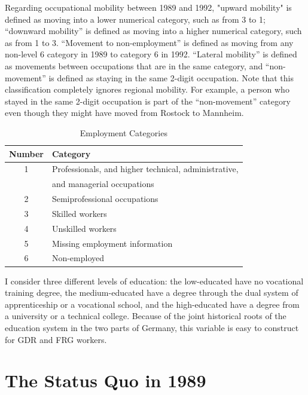 \begin{Article}
\begin{refsection}[Spitz]
Regarding occupational mobility between 1989 and 1992, "upward mobility" is defined as moving into a lower numerical category, such as from 3 to 1; ``downward mobility'' is defined as moving into a higher numerical category, such as from 1 to 3. ``Movement to non-employment'' is defined as moving from any non-level 6 category in 1989 to category 6 in 1992. ``Lateral mobility'' is defined as movements between occupations that are in the same category, and ``non-movement'' is defined as staying in the same 2-digit occupation. Note that this classification completely ignores regional mobility. For example, a person who stayed in the same 2-digit occupation is part of the  ``non-movement'' category even though they might have moved from Rostock to Mannheim.


\begin{table}[h!]
\caption{Employment Categories}\label{tab1}
\centering
\begin{tabular}{cl}
\toprule
Number & Category \\
\midrule
1 & Professionals, and higher technical, administrative, \\
  & and managerial occupations \\ 
2 & Semiprofessional occupations \\ 
3 & Skilled workers \\ 
4 & Unskilled workers \\
5 & Missing employment information \\ 
6 & Non-employed \\ \bottomrule
\end{tabular}
\end{table}


\clearpage
I consider three different levels of education: the low-educated have no vocational training degree, the medium-educated have a degree through the dual system of apprenticeship or a vocational school, and the high-educated have a degree from a university or a technical college. Because of the joint historical roots of the education system in the two parts of Germany, this variable is easy to construct for GDR and FRG workers.



\section{The Status Quo in 1989}\label{StatusQuo}


\end{refsection}
\end{Article}
